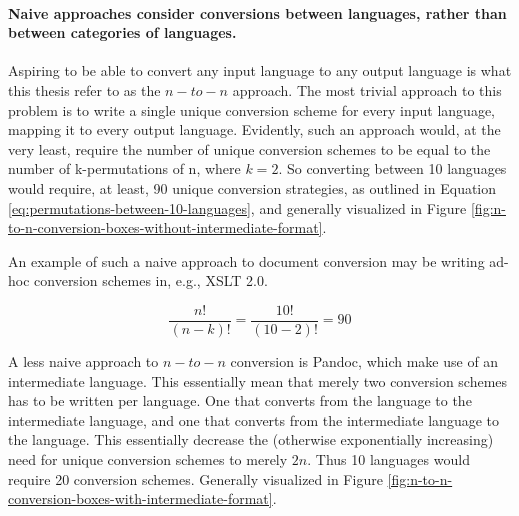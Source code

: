 \documentclass{scrreprt}
\begin{document}
\paragraph{Naive approaches consider conversions between languages, rather than between categories of languages. } Aspiring to be able to convert any input language to any output language is what this thesis refer to as the $n-to-n$ approach. The most trivial approach to this problem is to write a single unique conversion scheme for every input language, mapping it to every output language. Evidently, such an approach would, at the very least, require the number of unique  conversion schemes to be equal to the number of k-permutations of n, where $k=2$. So converting between 10 languages would require, at least, 90 unique conversion strategies, as outlined in Equation \ref{eq:permutations-between-10-languages}, and generally visualized in Figure \ref{fig:n-to-n-conversion-boxes-without-intermediate-format}.

An example of such a naive approach to document conversion may be writing ad-hoc conversion schemes in, e.g., XSLT 2.0.

\begin{equation}
\frac{n!}{(n-k)!} = \frac{10!}{(10-2)!} = 90
\label{eq:permutations-between-10-languages}
\end{equation}

A less naive approach to $n-to-n$ conversion is Pandoc, which make use of an intermediate language. This essentially mean that merely two conversion schemes has to be written per language. One that converts from the language to the intermediate language, and one that converts from the intermediate language to the language. This essentially decrease the (otherwise exponentially increasing) need for unique conversion schemes to merely $2n$. Thus 10 languages would require 20 conversion schemes. Generally visualized in Figure \ref{fig:n-to-n-conversion-boxes-with-intermediate-format}.
\end{document}
